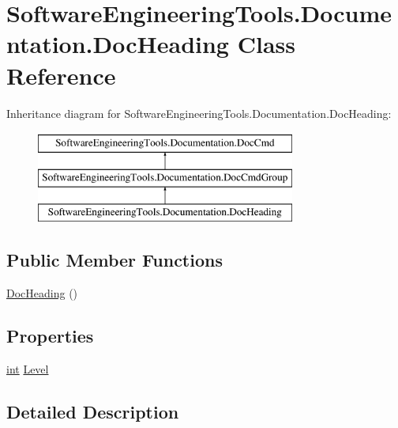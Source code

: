 \hypertarget{class_software_engineering_tools_1_1_documentation_1_1_doc_heading}{\section{Software\+Engineering\+Tools.\+Documentation.\+Doc\+Heading Class Reference}
\label{class_software_engineering_tools_1_1_documentation_1_1_doc_heading}
}
Inheritance diagram for Software\+Engineering\+Tools.\+Documentation.\+Doc\+Heading\+:\begin{figure}[H]
\begin{center}
\leavevmode
\includegraphics[height=3.000000cm]{class_software_engineering_tools_1_1_documentation_1_1_doc_heading}
\end{center}
\end{figure}
\subsection*{Public Member Functions}
\begin{DoxyCompactItemize}
\item 
\hyperlink{class_software_engineering_tools_1_1_documentation_1_1_doc_heading_a99e5ae13865091d9d2db930066de75c6}{Doc\+Heading} ()
\end{DoxyCompactItemize}
\subsection*{Properties}
\begin{DoxyCompactItemize}
\item 
\hyperlink{namespace_software_engineering_tools_1_1_documentation_a4a8017aa254d1d05b03db5132b7dd3a7afa7153f7ed1cb6c0fcf2ffb2fac21748}{int} \hyperlink{class_software_engineering_tools_1_1_documentation_1_1_doc_heading_ab4db448b267cbef63884b9e6686e7e65}{Level}
\end{DoxyCompactItemize}


\subsection{Detailed Description}


